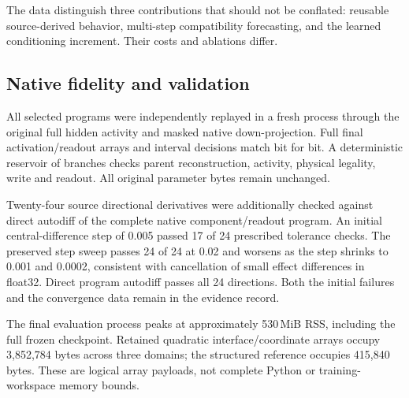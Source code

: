 \documentclass[11pt]{article}
\begin{document}
\begin{table}[t]
\centering\small
\caption{Satisfied conditions by domain, 96 per column. Heterogeneity matters:
a global quadratic is substantially less faithful in the highest relative
perturbation domain.}
\label{tab:domains}
\end{table}

The data distinguish three contributions that should not be conflated:
reusable source-derived behavior, multi-step compatibility forecasting, and
the learned conditioning increment. Their costs and ablations differ.

\subsection{Native fidelity and validation}
All \NativeReplays{} selected programs were independently replayed in a fresh
process through the original full hidden activity and masked native
down-projection. Full final activation/readout arrays and interval decisions
match bit for bit. A deterministic reservoir of \BranchChecks{} branches
checks parent reconstruction, activity, physical legality, write and readout.
All original parameter bytes remain unchanged.

Twenty-four source directional derivatives were additionally checked against
direct autodiff of the complete native component/readout program. An initial
central-difference step of 0.005 passed 17 of 24 prescribed tolerance checks.
The preserved step sweep passes 24 of 24 at 0.02 and worsens as the step shrinks
to 0.001 and 0.0002, consistent with cancellation of small effect differences
in float32. Direct program autodiff passes all 24 directions. Both the initial
failures and the convergence data remain in the evidence record.

The final evaluation process peaks at approximately 530\,MiB RSS, including
the full frozen checkpoint. Retained quadratic interface/coordinate arrays
occupy 3,852,784 bytes across three domains; the structured reference occupies
415,840 bytes. These are logical array payloads, not complete Python or
training-workspace memory bounds.
\end{document}
